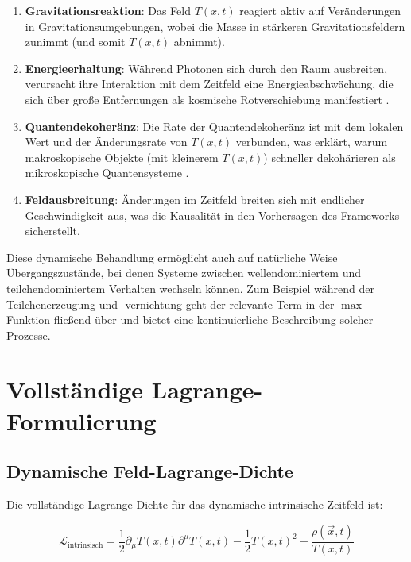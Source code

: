 \documentclass[12pt,a4paper]{article}
\newcommand{\Tfieldt}{T(x,t)}
\newcommand{\vecx}{\vec{x}}
\begin{document}
	\begin{enumerate}
		\item \textbf{Gravitationsreaktion}: Das Feld $\Tfieldt$ reagiert aktiv auf Veränderungen in Gravitationsumgebungen, wobei die Masse in stärkeren Gravitationsfeldern zunimmt (und somit $\Tfieldt$ abnimmt).
		
		\item \textbf{Energieerhaltung}: Während Photonen sich durch den Raum ausbreiten, verursacht ihre Interaktion mit dem Zeitfeld eine Energieabschwächung, die sich über große Entfernungen als kosmische Rotverschiebung manifestiert \cite{pascher_galaxies_2025}.
		
		\item \textbf{Quantendekoheränz}: Die Rate der Quantendekoheränz ist mit dem lokalen Wert und der Änderungsrate von $\Tfieldt$ verbunden, was erklärt, warum makroskopische Objekte (mit kleinerem $\Tfieldt$) schneller dekohärieren als mikroskopische Quantensysteme \cite{pascher_quantum_2025}.
		
		\item \textbf{Feldausbreitung}: Änderungen im Zeitfeld breiten sich mit endlicher Geschwindigkeit aus, was die Kausalität in den Vorhersagen des Frameworks sicherstellt.
	\end{enumerate}
	
	Diese dynamische Behandlung ermöglicht auch auf natürliche Weise Übergangszustände, bei denen Systeme zwischen wellendominiertem und teilchendominiertem Verhalten wechseln können. Zum Beispiel während der Teilchenerzeugung und -vernichtung geht der relevante Term in der $\max$-Funktion fließend über und bietet eine kontinuierliche Beschreibung solcher Prozesse.
	
	\section{Vollständige Lagrange-Formulierung}
	\label{sec:lagrangian_formulation}
	
	\subsection{Dynamische Feld-Lagrange-Dichte}
	\label{subsec:dynamic_lagrangian}
	
	Die vollständige Lagrange-Dichte für das dynamische intrinsische Zeitfeld ist:
	
	\begin{equation}
		\mathcal{L}_{\text{intrinsisch}} = \frac{1}{2}\partial_{\mu}\Tfieldt\partial^{\mu}\Tfieldt - \frac{1}{2}\Tfieldt^2 - \frac{\rho(\vecx,t)}{\Tfieldt}
		\label{eq:intrinsic_lagrangian}
	\end{equation}
	
\end{document}
